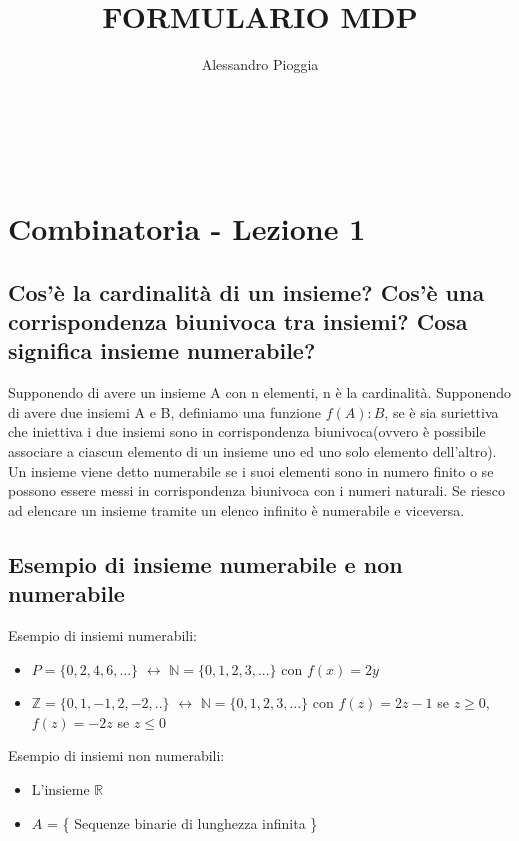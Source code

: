 \documentclass[a4paper,12pt]{report}
\title{\textbf{FORMULARIO MDP}}
\author{Alessandro Pioggia}
\begin{document}
	
	\makeatletter
	\begin{titlepage}
		\begin{center}
			{\Huge  \@title }\\[3ex] 
			{\large  \@author}\\[3ex] 
			{\large \@date}
		\end{center}
	\end{titlepage}
	\makeatother
	\thispagestyle{empty}
	\newpage
	
	
	\tableofcontents
	
	
		
	\newpage
	
	\section{Combinatoria - Lezione 1}
	\subsection{Cos'è la cardinalità di un insieme? Cos'è una corrispondenza biunivoca tra insiemi? Cosa significa insieme numerabile?}
	Supponendo di avere un insieme A con n elementi, n è la cardinalità. 
	Supponendo di avere due insiemi A e B, definiamo una funzione $f(A) : B$, se  è sia suriettiva che iniettiva i due insiemi sono in corrispondenza biunivoca(ovvero è possibile associare a ciascun elemento di un insieme uno ed uno solo elemento dell'altro).
	Un insieme viene detto numerabile se i suoi elementi sono in numero finito o se  possono essere messi in corrispondenza biunivoca con i numeri naturali. Se riesco ad elencare un insieme tramite un elenco infinito è numerabile e viceversa.
	\subsection{Esempio di insieme numerabile e non numerabile}
	Esempio di insiemi numerabili: 
	\begin{itemize}
		\item $P = \{0, 2, 4, 6, ...\}$ $\leftrightarrow$ $\mathbb{N} = \{0, 1, 2, 3, ...\}$ con $f(x) = 2y$
		\item $\mathbb{Z} = \{0, 1, -1, 2, -2, ..\}$ $\leftrightarrow$ $\mathbb{N} = \{0, 1, 2, 3, ...\}$ con $f(z) = 2z - 1$ se $z \ge 0$, $f(z) = -2z$ se $z \leq 0$
	\end{itemize}
	Esempio di insiemi non numerabili:
	\begin{itemize}
		\item L'insieme $\mathbb{R}$
		\item $A$ = \{ Sequenze binarie di lunghezza infinita \}
	\end{itemize}
\end{document}
